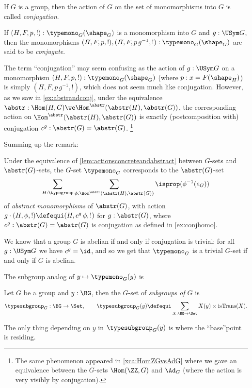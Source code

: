 \begin{definition}
  \label{def:conjactonmonos}
  If $G$ is a group, then the action of $G$ on the set of monomorphisms into $G$ is called \emph{conjugation}.

  \label{def:conjugate}
  If $(H,F,p,!):\typemono_G(\shape_G)$ is a monomorphism into $G$ and $g:\USym G$, then the monomorphisms  $(H,F,p,!),(H,F,p\,g^{-1},!):\typemono_G(\shape_G)$ are said to be \emph{conjugate}.
\end{definition}
\begin{remark}
  \label{rem:whyconjugate}
  The term ``conjugation'' may seem confusing as the %
action of $g:\USym G$ on a monomorphism $(H,F,p,!):\typemono_G(\shape_G)$ (where $p:x=F(\shape_H)$) is simply $(H,F,p\,g^{-1},!)$, which does not seem much like conjugation.
However, as we saw in \cref{ex:abstrandconj}, under the equivalence $\abstr:\Hom(H,G)\we\Hom^\abstr(\abstr(H),\abstr(G))$, the corresponding action on $\Hom^\abstr(\abstr(H),\abstr(G))$ is exactly (postcomposition with) conjugation $c^g:\abstr(G)=\abstr(G)$.
\footnote{The same phenomenon appeared in \cref{xca:HomZGvsAdG} where we gave an equivalence between the $G$-sets $\Hom(\ZZ,G)$ and $\Ad_G$ (where the action is very visibly by conjugation).}
  \label{rem:conjactiononmonos}
\end{remark}
Summing up the remark:
\begin{lemma}
  \label{lem:conjugationabstractly}
  Under the equivalence of \cref{lem:actionsconcreteandabstract} between $G$-sets and $\abstr(G)$-sets, the $G$-set $\typemono_G$ corresponds to the $\abstr(G)$-set
$$\sum_{H:\typegroup}\sum_{\phi:\Hom^\abstr(\abstr(H),\abstr(G))}\isprop(\phi^{-1}(e_G))$$ of \emph{abstract monomorphisms} of $\abstr(G)$, with action $g\cdot(H,\phi,!)\defequi(H,c^g\,\phi,!)$ for $g:\abstr(G)$, where  $c^g:\abstr(G)=\abstr(G)$ is conjugation as defined in \cref{ex:conjhomo}.
\end{lemma}
\begin{remark}
  \label{rem:typeofsubgpstrivifab}
  We know that a group $G$ is abelian if and only if conjugation is trivial: for all $g:\USym G$ we have $c^g=\id$, and so we get that $\typemono_G$ is a trivial $G$-set if and only if $G$ is abelian.
\end{remark}

The subgroup analog of $y\mapsto\typemono_G(y)$ is

\begin{definition}
  Let $G$ be a group and $y:\BG$, then the $G$-set of \emph{subgroups of $G$} is
  $$\typesubgroup_G:\BG\to\Set,\qquad\typesubgroup_G(y)\defequi\sum_{X:\BG\to\Set}
  X(y)\times\mathrm{isTrans}(X).$$
\end{definition}
The only thing depending on $y$ in $\typesubgroup_G(y)$ is where the ``base''point is residing.

